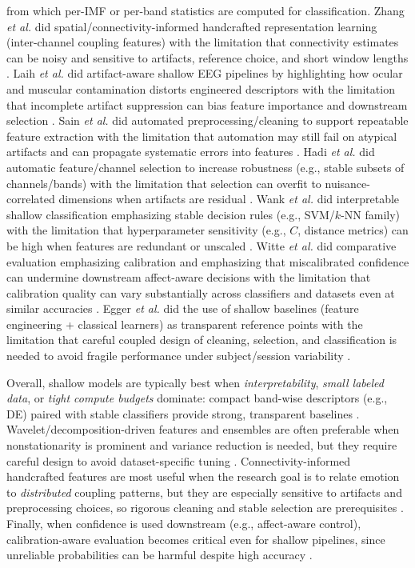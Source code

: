 \documentclass{WileyMSP-template}
\begin{document}
from which per-IMF or per-band statistics are computed for classification. Zhang \textit{et al.} did spatial/connectivity-informed handcrafted representation learning (inter-channel coupling features) with the limitation that connectivity estimates can be noisy and sensitive to artifacts, reference choice, and short window lengths \cite{tzhang2019spatialt}. Laih \textit{et al.} did artifact-aware shallow EEG pipelines by highlighting how ocular and muscular contamination distorts engineered descriptors with the limitation that incomplete artifact suppression can bias feature importance and downstream selection \cite{cqlaih2018artifact}. Sain \textit{et al.} did automated preprocessing/cleaning to support repeatable feature extraction with the limitation that automation may still fail on atypical artifacts and can propagate systematic errors into features \cite{cysain2018automate}. Hadi \textit{et al.} did automatic feature/channel selection to increase robustness (e.g., stable subsets of channels/bands) with the limitation that selection can overfit to nuisance-correlated dimensions when artifacts are residual \cite{sphadi2021automati}. Wank \textit{et al.} did interpretable shallow classification emphasizing stable decision rules (e.g., SVM/$k$-NN family) with the limitation that hyperparameter sensitivity (e.g., $C$, distance metrics) can be high when features are redundant or unscaled \cite{sbwank2019ikknpred}. Witte \textit{et al.} did comparative evaluation emphasizing calibration and emphasizing that miscalibrated confidence can undermine downstream affect-aware decisions with the limitation that calibration quality can vary substantially across classifiers and datasets even at similar accuracies \cite{jwitte2020comparis}. Egger \textit{et al.} did the use of shallow baselines (feature engineering + classical learners) as transparent reference points with the limitation that careful coupled design of cleaning, selection, and classification is needed to avoid fragile performance under subject/session variability \cite{megger2019emotionr}.

Overall, shallow models are typically best when \emph{interpretability}, \emph{small labeled data}, or \emph{tight compute budgets} dominate: compact band-wise descriptors (e.g., DE) paired with stable classifiers provide strong, transparent baselines \cite{ztliuq2019electroe,gkpvee2019eegbased}. Wavelet/decomposition-driven features and ensembles are often preferable when nonstationarity is prominent and variance reduction is needed, but they require careful design to avoid dataset-specific tuning \cite{thzhou2020waveletb}. Connectivity-informed handcrafted features are most useful when the research goal is to relate emotion to \emph{distributed} coupling patterns, but they are especially sensitive to artifacts and preprocessing choices, so rigorous cleaning and stable selection are prerequisites \cite{tzhang2019spatialt,cqlaih2018artifact,sphadi2021automati}. Finally, when confidence is used downstream (e.g., affect-aware control), calibration-aware evaluation becomes critical even for shallow pipelines, since unreliable probabilities can be harmful despite high accuracy \cite{jwitte2020comparis,megger2019emotionr}.
\end{document}
